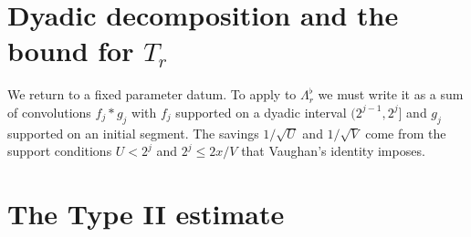 









\section{Dyadic decomposition and the bound for \texorpdfstring{$T_r$}{T\_r}}\label{sec:dyadic}

We return to a fixed parameter datum. To apply  to $\Lambda^\flat_r$
we must write it as a sum of convolutions $f_j * g_j$ with $f_j$ supported on a dyadic interval
$(2^{j-1}, 2^j]$ and $g_j$ supported on an initial segment. The savings $1/\sqrt U$ and $1/\sqrt V$
come from the support conditions $U < 2^j$ and $2^j \le 2x/V$ that Vaughan's identity imposes.




\section{The Type II estimate}


